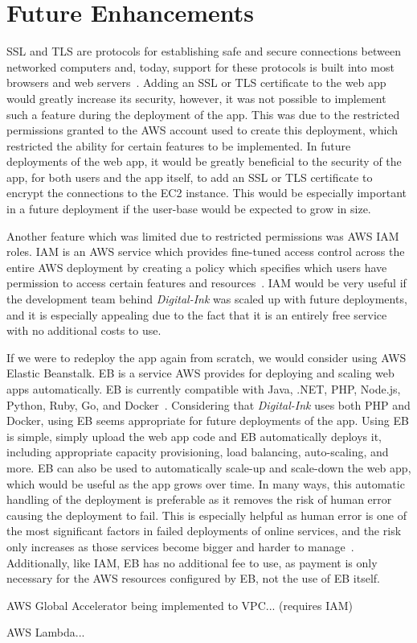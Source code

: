 \chapter{Future Enhancements}\label{ch:future-enhancements}

SSL and TLS are protocols for establishing safe and secure connections between networked computers and, today, support
for these protocols is built into most browsers and web servers~\parencite{thomas2000ssl}.
Adding an SSL or TLS certificate to the web app would greatly increase its security, however, it was not possible to
implement such a feature during the deployment of the app.
This was due to the restricted permissions granted to the AWS account used to create this deployment, which
restricted the ability for certain features to be implemented.
In future deployments of the web app, it would be greatly beneficial to the security of the app, for both users and the
app itself, to add an SSL or TLS certificate to encrypt the connections to the EC2 instance.
This would be especially important in a future deployment if the user-base would be expected to grow in size.

Another feature which was limited due to restricted permissions was AWS IAM roles.
IAM is an AWS service which provides fine-tuned access control across the entire AWS deployment by creating a policy
which specifies which users have permission to access certain features and resources~\parencite{amazon2022aws2}.
IAM would be very useful if the development team behind \textit{Digital-Ink} was scaled up with future
deployments, and it is especially appealing due to the fact that it is an entirely free service with no additional
costs to use.

If we were to redeploy the app again from scratch, we would consider using AWS Elastic Beanstalk.
EB is a service AWS provides for deploying and scaling web apps automatically.
EB is currently compatible with Java, .NET, PHP, Node.js, Python, Ruby, Go, and Docker~\parencite{amazon2022aws3}.
Considering that \textit{Digital-Ink} uses both PHP and Docker, using EB seems appropriate for future
deployments of the app.
Using EB is simple, simply upload the web app code and EB automatically deploys it, including appropriate
capacity provisioning, load balancing, auto-scaling, and more.
EB can also be used to automatically scale-up and scale-down the web app, which would be useful as the app
grows over time.
In many ways, this automatic handling of the deployment is preferable as it removes the risk of human error
causing the deployment to fail.
This is especially helpful as human error is one of the most significant factors in failed deployments of online
services, and the risk only increases as those services become bigger and harder to manage~\autocite{kraemer2007human}.
Additionally, like IAM, EB has no additional fee to use, as payment is only necessary for the AWS resources
configured by EB, not the use of EB itself.

AWS Global Accelerator being implemented to VPC... (requires IAM)

AWS Lambda...

